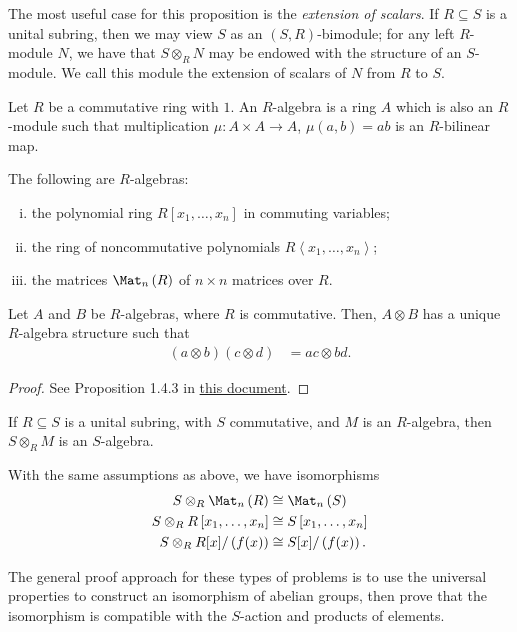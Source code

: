 \documentclass[10pt]{mypackage}
\begin{document}
The most useful case for this proposition is the \textit{extension of scalars}. If $R\subseteq S$ is a unital subring, then we may view $S$ as an $\left( S,R \right)$-bimodule; for any left $R$-module $N$, we have that $S\otimes_{R}N$ may be endowed with the structure of an $S$-module. We call this module the extension of scalars of $N$ from $R$ to $S$.
\begin{definition}
  Let $R$ be a commutative ring with $1$. An $R$-algebra is a ring $A$ which is also an $R$-module such that multiplication $\mu\colon A\times A\rightarrow A$, $\mu\left( a,b \right) = ab$ is an $R$-bilinear map.
\end{definition}
\begin{example}
  The following are $R$-algebras:
  \begin{enumerate}[(i)]
    \item the polynomial ring $R\left[ x_1,\dots,x_n \right]$ in commuting variables;
    \item the ring of noncommutative polynomials $R \left\langle x_1,\dots,x_n \right\rangle$;
    \item the matrices $\Mat_n\left( R \right)$ of $n\times n$ matrices over $R$.
  \end{enumerate}
\end{example}
\begin{theorem}
  Let $A$ and $B$ be $R$-algebras, where $R$ is commutative. Then, $A\otimes B$ has a unique $R$-algebra structure such that
  \begin{align*}
    \left( a\otimes b \right)\left( c\otimes d \right) &= ac\otimes bd.
  \end{align*}
\end{theorem}
\begin{proof}
  See Proposition 1.4.3 in \href{https://ai.avinash-iyer.com/Classes_and_Homework/College/Y4/Honors\%20Thesis/Amenability\%20Text/amenability.pdf}{this document}.
\end{proof}
\begin{lemma}
  If $R\subseteq S$ is a unital subring, with $S$ commutative, and $M$ is an $R$-algebra, then $S\otimes_{R}M$ is an $S$-algebra.
\end{lemma}
\begin{lemma}
  With the same assumptions as above, we have isomorphisms
  \begin{align*}
    S\otimes_{R}\Mat_n\left( R \right) &\cong \Mat_n\left( S \right)\\
    S\otimes_{R} R\left[ x_1,\dots,x_n \right] &\cong S\left[ x_1,\dots,x_n \right]\\
  S\otimes_{R} R[x]/\left( f(x) \right) &\cong S[x]/\left( f(x) \right).
  \end{align*}
\end{lemma}
The general proof approach for these types of problems is to use the universal properties to construct an isomorphism of abelian groups, then prove that the isomorphism is compatible with the $S$-action and products of elements.
\end{document}
